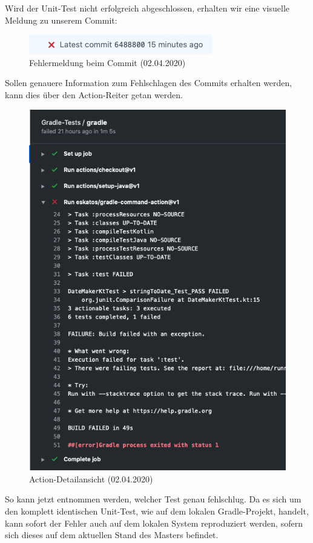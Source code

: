  Wird der Unit-Test nicht erfolgreich abgeschlossen, erhalten wir eine visuelle Meldung zu unserem Commit:
\begin{figure}[H]
    \centering
    \includegraphics[scale=1]{images/github-action-error.png}
    \caption{Fehlermeldung beim Commit (02.04.2020)}
\end{figure}
Sollen genauere Information zum Fehlschlagen des Commits erhalten werden, kann dies über den Action-Reiter getan werden.
\begin{figure}[H]
    \centering
    \includegraphics[scale=0.5]{images/github-action-detail-error.png}
    \caption{Action-Detailansicht (02.04.2020)}
\end{figure}
So kann jetzt entnommen werden, welcher Test genau fehlschlug. Da es sich um den komplett identischen Unit-Test, wie auf dem lokalen Gradle-Projekt, handelt, kann sofort der Fehler auch auf dem lokalen System reproduziert werden, sofern sich dieses auf dem aktuellen Stand des Masters befindet. 
